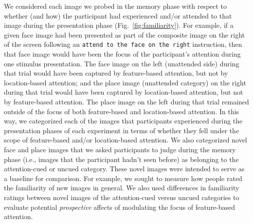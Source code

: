 \documentclass[english]{article}
\begin{document}
We considered each image we probed in the memory phase with respect to whether
(and how) the participant had experienced and/or attended to that image during
the presentation phase (Fig.~\ref{fig:familiarity}). For example, if a given
face image had been presented as part of the composite image on the right of
the screen following an \texttt{attend to the face on the right} instruction,
then that face image would have been the focus of the participant's attention
during one stimulus presentation. The face image on the left (unattended side)
during that trial would have been captured by feature-based attention, but not
by location-based attention; and the place image (unattended category) on the
right during that trial would have been captured by location-based attention,
but not by feature-based attention. The place image on the left during that
trial remained outside of the focus of both feature-based and location-based
attention. In this way, we categorized each of the images that participants
experienced during the presentation phases of each experiment in terms of
whether they fell under the scope of feature-based and/or location-based
attention. We also categorized novel face and place images that we asked
participants to judge during the memory phase (i.e., images that the
participant hadn't seen before) as belonging to the attention-cued or uncued
category. These novel images were intended to serve as a baseline for
comparison. For example, we sought to measure how people rated the familiarity
of new images in general. We also used differences in familiarity ratings
between novel images of the attention-cued versus uncued categories to evaluate
potential \textit{prospective} affects of modulating the focus of feature-based
attention.
\end{document}
